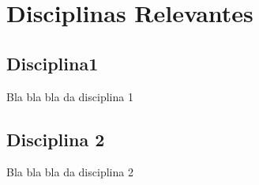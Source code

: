 \chapter{Disciplinas Relevantes}
\label{cap:disciplinas}

\section{Disciplina1}
\label{sec:disciplina1}

Bla bla bla da disciplina 1


\section{Disciplina 2}
\label{sec:disciplina2}

Bla bla bla da disciplina 2


